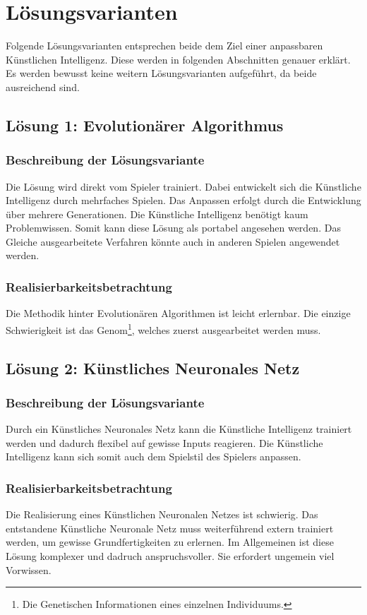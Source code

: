 \section{Lösungsvarianten}
Folgende Lösungsvarianten entsprechen beide dem Ziel einer anpassbaren Künstlichen Intelligenz. Diese werden in folgenden Abschnitten genauer
erklärt. Es werden bewusst keine weitern Lösungsvarianten aufgeführt, da beide ausreichend sind.
\subsection{Lösung 1: Evolutionärer Algorithmus}
\subsubsection{Beschreibung der Lösungsvariante}
Die Lösung wird direkt vom Spieler trainiert. Dabei entwickelt sich die Künstliche Intelligenz durch mehrfaches Spielen. Das Anpassen erfolgt durch die Entwicklung über mehrere Generationen. Die Künstliche Intelligenz benötigt kaum Problemwissen. Somit kann diese Lösung als portabel angesehen werden. Das Gleiche ausgearbeitete Verfahren könnte auch in anderen Spielen angewendet werden.
\subsubsection{Realisierbarkeitsbetrachtung}
Die Methodik hinter Evolutionären Algorithmen ist leicht erlernbar. Die einzige Schwierigkeit ist das Genom\footnote{Die Genetischen Informationen eines einzelnen Individuums.}, welches zuerst ausgearbeitet werden muss.
\subsection{Lösung 2: Künstliches Neuronales Netz}
\subsubsection{Beschreibung der Lösungsvariante}
Durch ein Künstliches Neuronales Netz kann die Künstliche Intelligenz trainiert werden und dadurch flexibel auf gewisse Inputs reagieren. Die Künstliche Intelligenz kann sich somit auch dem Spielstil des Spielers anpassen.
\subsubsection{Realisierbarkeitsbetrachtung}
Die Realisierung eines Künstlichen Neuronalen Netzes ist schwierig. Das entstandene Künstliche Neuronale Netz muss weiterführend extern trainiert werden, um gewisse Grundfertigkeiten zu erlernen. Im Allgemeinen ist diese Lösung komplexer und dadruch anspruchsvoller. Sie erfordert ungemein viel Vorwissen.
